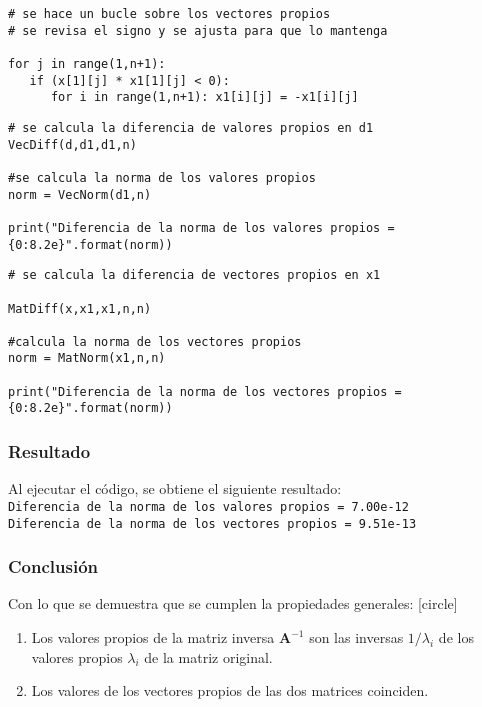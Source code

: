 \begin{frame}[fragile]
\begin{lstlisting}[basicstyle=\linespread{0.9}\ttfamily\normalsize, columns=fullflexible]
# se hace un bucle sobre los vectores propios
# se revisa el signo y se ajusta para que lo mantenga

for j in range(1,n+1):
   if (x[1][j] * x1[1][j] < 0):
      for i in range(1,n+1): x1[i][j] = -x1[i][j] 
\end{lstlisting}
\end{frame}
\begin{frame}[fragile]
\begin{lstlisting}[basicstyle=\linespread{0.9}\ttfamily\normalsize, columns=fullflexible]
# se calcula la diferencia de valores propios en d1
VecDiff(d,d1,d1,n)

#se calcula la norma de los valores propios
norm = VecNorm(d1,n)

print("Diferencia de la norma de los valores propios = {0:8.2e}".format(norm))
\end{lstlisting}
\end{frame}
\begin{frame}[fragile]
\begin{lstlisting}[basicstyle=\linespread{0.9}\ttfamily\normalsize, columns=fullflexible]
# se calcula la diferencia de vectores propios en x1

MatDiff(x,x1,x1,n,n)

#calcula la norma de los vectores propios
norm = MatNorm(x1,n,n)

print("Diferencia de la norma de los vectores propios = {0:8.2e}".format(norm))
\end{lstlisting}
\end{frame}
\begin{frame}
\frametitle{Resultado}
Al ejecutar el código, se obtiene el siguiente resultado:
\\
\bigskip
\texttt{Diferencia de la norma de los valores propios = 7.00e-12
\\
\medskip
Diferencia de la norma de los vectores propios = 9.51e-13}
\end{frame}
\begin{frame}
\frametitle{Conclusión}
Con lo que se demuestra que se cumplen la propiedades generales:
[circle]
\begin{enumerate}[<+->]
\item Los valores propios de la matriz inversa $\mathbf{A}^{-1}$ son las inversas $1 / \lambda_{i}$ de los valores propios $\lambda_{i}$ de la matriz original.
\item Los valores de los vectores propios de las dos matrices coinciden.
\end{enumerate}
\end{frame}
